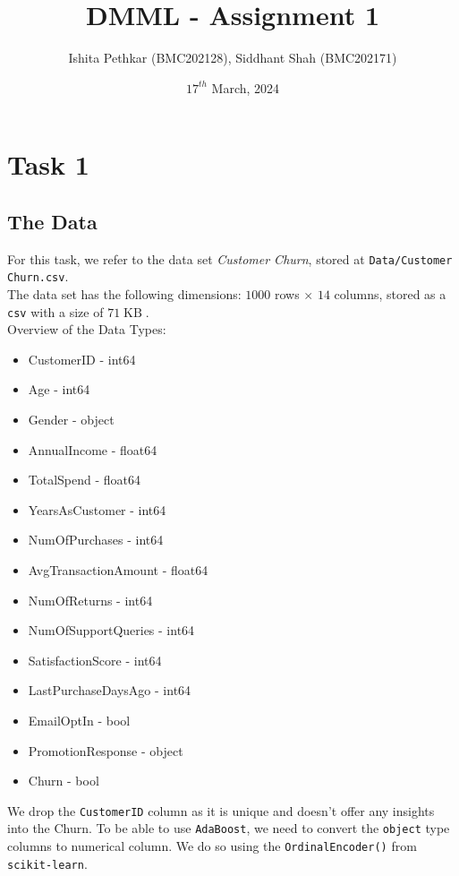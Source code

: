 \documentclass{article}
\title{DMML - Assignment 1}
\author{Ishita Pethkar (BMC202128), Siddhant Shah (BMC202171)}
\date{$17^{th}$ March, 2024}
\begin{document}
\thispagestyle{empty}
\maketitle

\tableofcontents
\newpage

\section{Task 1}

\subsection{The Data}
    For this task, we refer to the data set \textit{Customer Churn}, stored at \verb|Data/Customer Churn.csv|. \\
    The data set has the following dimensions: $1000$ rows $\times$ $14$ columns, stored as a \verb|csv| with a size of $71 \operatorname{KB}$. \\
    Overview of the Data Types:
    \begin{itemize}
        \item CustomerID - int64
        \item Age - int64
        \item Gender - object
        \item AnnualIncome - float64
        \item TotalSpend - float64
        \item YearsAsCustomer - int64
        \item NumOfPurchases - int64
        \item AvgTransactionAmount - float64
        \item NumOfReturns - int64
        \item NumOfSupportQueries - int64
        \item SatisfactionScore - int64
        \item LastPurchaseDaysAgo - int64
        \item EmailOptIn - bool
        \item PromotionResponse - object
        \item Churn - bool
    \end{itemize}
    We drop the \verb|CustomerID| column as it is unique and doesn't offer any insights into the Churn.
    To be able to use \verb|AdaBoost|, we need to convert the \verb|object| type columns to numerical column. We do so using the \verb|OrdinalEncoder()| from \verb|scikit-learn|. 
\end{document}

